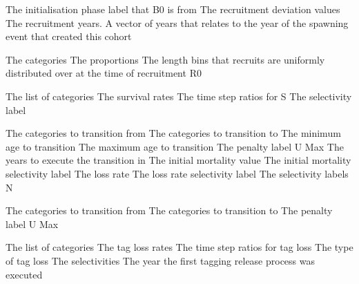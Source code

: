  {The initialisation phase label that B0 is from}
 {The recruitment deviation values}
 {The recruitment years. A vector of years that relates to the year of the spawning event that created this cohort}
\par\textbf{}\par
{} {The categories}
 {The proportions}
 {The length bins that recruits are uniformly distributed over at the time of recruitment}
 {R0}
\par\textbf{}\par
{} {The list of categories}
 {The survival rates}
 {The time step ratios for S}
 {The selectivity label}
\par\textbf{}\par
{} {The categories to transition from}
 {The categories to transition to}
 {The minimum age to transition}
 {The maximum age to transition}
 {The penalty label}
 {U Max}
 {The years to execute the transition in}
 {The initial mortality value}
 {The initial mortality selectivity label}
 {The loss rate}
 {The loss rate selectivity label}
 {The selectivity labels}
 {N}
\par\textbf{}\par
{} {The categories to transition from}
 {The categories to transition to}
 {The penalty label}
 {U Max}
 {}
 {}
 {}
 {}
\par\textbf{}\par
{} {The list of categories}
 {The tag loss rates}
 {The time step ratios for tag loss}
 {The type of tag loss}
 {The selectivities}
 {The year the first tagging release process was executed}
